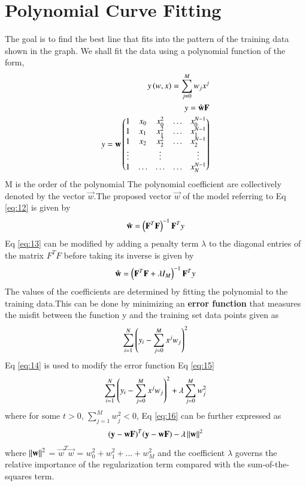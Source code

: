 \documentclass[journal,12pt,twocolumn]{IEEEtran}
\begin{document}
\section{Polynomial Curve Fitting}
The goal is to find the best line that fits into the  pattern of the training data shown in the graph.
We shall fit the data using a polynomial function of the form, 
\begin{align}
     y\left(w,x\right)= \sum_{j=0}^{M} w_j x^{j}\\
     y = \hat{\mathbf{w}}\mathbf{F}\\
     y = \mathbf{w}\begin{pmatrix} 1 & x_{0} & x_{0}^2 & \ldots & x_{0}^{N-1} \\
		1 & x_{1} & x_{1}^2 & \ldots & x_{1}^{N-1} \\
		1 & x_{2} & x_{2}^2 & \ldots & x_{2}^{N-1} \\
		\vdots & & \vdots &  & \vdots  \\
		    1 & \ldots & \ldots & \ldots & x_{N}^{N-1} \end{pmatrix}
\end{align}
M is the order of the polynomial
The polynomial coefficient are collectively denoted by the vector $\vec{w}$.The proposed vector $\vec{w}$ of the model referring to Eq \eqref{eq:12} is given by 
\begin{align}
    \hat{\mathbf{w}} = \left(\mathbf{F}^T\mathbf{F}\right)^{-1}\mathbf{F}^Ty \label{eq:13}
\end{align}
Eq \eqref{eq:13} can be modified by adding a penalty term $\lambda$ to the diagonal entries of the matrix $F^{T}F$ before taking its inverse is given by
\begin{align}
     \hat{\mathbf{w}} = \left(\mathbf{F}^T\mathbf{F} + \lambda I_{M}\right)^{-1}\mathbf{F}^Ty \label{eq:14}
\end{align}
The values of the coefficients are determined by fitting the polynomial to the
training data.This can be done by minimizing an \textbf{error function} that measures the
misfit between the function y and the training set data points given as
\begin{align}
    \sum_{i=1}^{N}\left(y_{i} - \sum_{j=0}^{M}x^{j}w_{j}\right)^2 \label{eq:15}
\end{align}
Eq \eqref{eq:14} is used to modify the error function Eq \eqref{eq:15}
\begin{align}
    \sum_{i=1}^{N}\left(y_{i} - \sum_{j=0}^{M}x^{j}w_{j}\right)^2 + \lambda\sum_{j=0}^{M}w_{j}^2\label{eq:16}
\end{align}
where for some  $t>0$, $\sum_{j=1}^{M}w_{j}^2<0$, 
Eq \eqref{eq:16} can be further expressed as
\begin{align}
    (\mathbf{y} - \mathbf{wF})^T(\mathbf{y} - \mathbf{wF}) - \lambda\left\lVert\mathbf{w}\right\rVert^2
\end{align}
where $\left\lVert\mathbf{w}\right\rVert^2$ = $\vec{w}^T\vec{w}$ = $w_{0}^2 + w_{1}^2 + ... +w_{M}^2$ and the coefficient $\lambda$ governs the relative importance of the regularization term compared with the sum-of-the-squares term.
\end{document}
